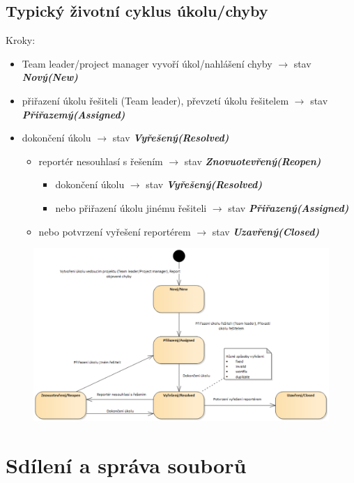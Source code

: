 \documentclass{szzclass}
\begin{document}
\subsection{Typický životní cyklus úkolu/chyby}
Kroky:
\begin{itemize}
    \item Team leader/project manager vyvoří úkol/nahlášení chyby $\rightarrow$ stav \textit{\textbf{Nový(New)}}
    \item přiřazení úkolu řešiteli (Team leader), převzetí úkolu řešitelem $\rightarrow$ stav \textit{\textbf{Přiřazemý(Assigned)}}
    \item dokončení úkolu $\rightarrow$ stav \textit{\textbf{Vyřešený(Resolved)}}
    \begin{itemize}
        \item reportér nesouhlasí s řešením $\rightarrow$ stav \textit{\textbf{Znovuotevřený(Reopen)}}
        \begin{itemize}
            \item dokončení úkolu $\rightarrow$ stav \textit{\textbf{Vyřešený(Resolved)}}
            \item nebo přiřazení úkolu jinému řešiteli $\rightarrow$ stav \textit{\textbf{Přiřazený(Assigned)}}
        \end{itemize}
        \item nebo potvrzení vyřešení reportérem $\rightarrow$ stav \textit{\textbf{Uzavřený(Closed)}}
    \end{itemize}
\end{itemize}
\begin{figure}
    \centering
    \includegraphics[width=1.3\textwidth]{topics/bi-spol-30/images/cycle.png}
\end{figure}
\newpage
\section{Sdílení a správa souborů}
\end{document}
